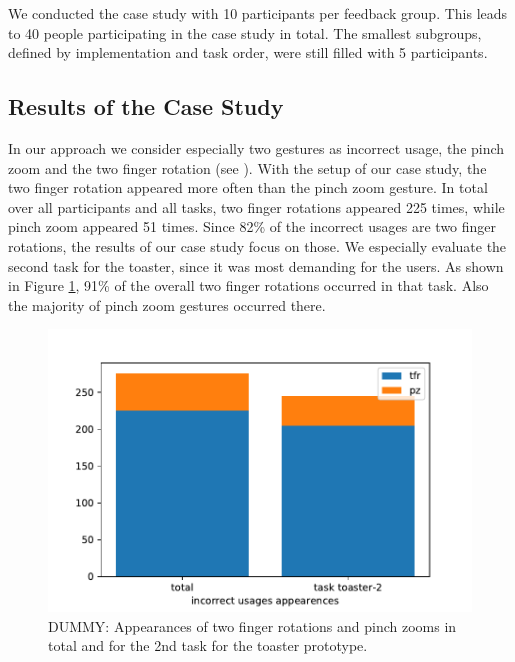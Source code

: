 \documentclass[11pt, a4paper]{article}
\begin{document}
			We conducted the case study with 10 participants per feedback group. This leads to 40 people participating in the case study in total. The smallest subgroups, defined by implementation and task order, were still filled with 5 participants.

		\subsection*{Results of the Case Study}\label{ssec:results}
			In our approach we consider especially two gestures as incorrect usage, the pinch zoom and the two finger rotation (see ). With the setup of our case study, the two finger rotation appeared more often than the pinch zoom gesture. In total over all participants and all tasks, two finger rotations appeared 225 times, while pinch zoom appeared 51 times. Since 82\% of the incorrect usages are two finger rotations, the results of our case study focus on those. We especially evaluate the second task for the toaster, since it was most demanding for the users. As shown in Figure \ref{fig:tfr_v_pz}, 91\% of the overall two finger rotations occurred in that task. Also the majority of pinch zoom gestures occurred there.

			\begin{figure}[H]
				\centering
				\includegraphics[width=.49\textwidth]{img/plot/plot_tfr_v_pz.pdf}
				\caption{DUMMY: Appearances of two finger rotations and pinch zooms in total and for the 2nd task for the toaster prototype.}
				\label{fig:tfr_v_pz}
			\end{figure}
\end{document}
